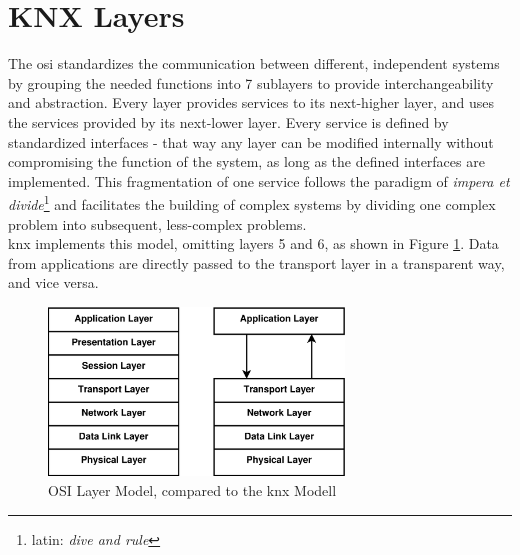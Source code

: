 \section{KNX Layers}\label{sec:knxLayers}

The \gls{osi} standardizes the communication between different, independent systems
by grouping the needed functions into 7 sublayers to provide interchangeability and abstraction. Every layer provides services to its next-higher layer, and
uses the services provided by its next-lower layer. Every service is defined by standardized interfaces - that way any layer can be modified internally without
compromising the function of the system, as long as the defined interfaces are implemented. This fragmentation of one service follows the paradigm of 
\textit{impera et divide}\footnote{latin: \textit{dive and rule}} and facilitates the building of complex systems by dividing one complex problem into subsequent,
less-complex problems.
\\
\gls{knx} implements this model, omitting 
layers 5 and 6, as shown in Figure \ref{fig:knxlayers}. Data from applications are directly passed to the transport layer in a transparent way, and vice versa.
\begin{figure}
    \centering
     \includegraphics[width=0.7\textwidth]{figures/isoOSI.eps}

    \caption{OSI Layer Model, compared to the \gls{knx} Modell}
    \label{fig:knxlayers}
\end{figure}

